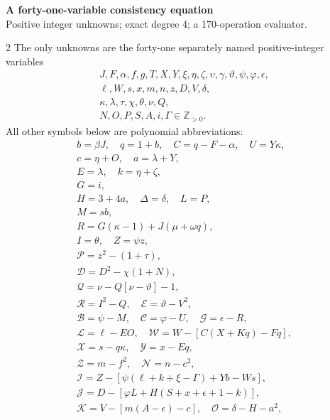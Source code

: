 \documentclass[10pt]{article}
\begin{document}
\begin{center}
{\large\bfseries A forty-one-variable consistency equation}\\[-1pt]
{\small Positive integer unknowns; exact degree 4; a 170-operation evaluator.}
\end{center}\vspace{-8pt}
\begin{multicols}{2}
\fontsize{8.6}{9.1}\selectfont
The only unknowns are the forty-one separately named positive-integer variables
\[
\begin{gathered}J,F,\alpha,f,g,T,X,Y,\xi,\eta,\zeta,\upsilon,\gamma,\vartheta,\psi,\varphi,\epsilon,\\
\ell,W,s,x,m,n,z,D,V,\delta,\\
\kappa,\lambda,\tau,\chi,\theta,\nu,Q,\\
N,O,P,S,A,i,\Gamma\in\mathbb Z_{>0}.\end{gathered}
\]
All other symbols below are polynomial abbreviations:
\[
\begin{gathered}
b=\beta J,\quad q=1+b,\quad C=q-F-\alpha,\quad U=Y\kappa,\\
c=\eta+O,\quad a=\lambda+Y,\\
E=\lambda,\quad k=\eta+\zeta,\\
G=i,\\
H=3+4a,\quad\Delta=\delta,\quad L=P,\\
M=sb,\\
R=G(\kappa-1)+J(\mu+\omega q),\\
I=\theta,\quad Z=\psi z,\\
\mathcal{P}=z^2-(1+\tau),\\
\mathcal{D}=D^2-\chi(1+N),\\
\mathcal{Q}=\nu-Q[\nu-\vartheta]-1,\\
\mathcal{R}=I^2-Q,\quad \mathcal{E}=\vartheta-V^2,\\
\mathcal{B}=\psi-M,\quad \mathcal{C}=\varphi-U,\quad \mathcal{G}=\epsilon-R,\\
\mathcal{L}=\ell-EO,\quad \mathcal{W}=W-[C(X+Kq)-Fq],\\
\mathcal{X}=s-q\kappa,\quad \mathcal{Y}=x-Eq,\\
\mathcal{Z}=m-f^2,\quad \mathcal{N}=n-c^2,\\
\mathcal{I}=Z-[\psi(\ell+k+\xi-\Gamma)+Yb-Ws],\\
\mathcal{J}=D-[\varphi L+H(S+x+\epsilon+1-k)],\\
\mathcal{K}=V-[m(A-\epsilon)-c],\quad\mathcal{O}=\delta-H-a^2,\\

\end{gathered}\]
\end{multicols}
\end{document}
